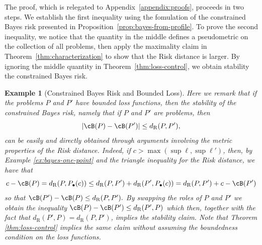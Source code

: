 \documentclass[twoside,11pt]{article}
\newtheorem{examples}[theorem]{Example}
\newcommand{\dexp}[1][]{d_{\mathrm{R}#1}}
\begin{document}
The proof, which is relegated to Appendix~\ref{appendix:proofs}, proceeds in two steps. We establish the first inequality using the fomulation of the constrained Bayes risk presented in Proposition~\ref{prop:bayes-from-profile}. To prove the second inequality, we notice that the quantity in the middle defines a pseudometric on the collection of all problems, then apply the maximality claim in Theorem~\ref{thm:characterization} to show that the Risk distance is larger.
By ignoring the middle quantity in Theorem~\ref{thm:loss-control}, we obtain stability the constrained Bayes risk. 
\begin{examples}[Constrained Bayes Risk and Bounded Loss]
Here we remark that if the problems $P$ and $P'$ have bounded loss functions, then the stability of the constrained Bayes risk, namely that 
if $P$ and $P'$ are problems, then
    \[|\cB(P) - \cB(P')| \leq \dexp(P,P'),\]
can be easily and directly obtained through arguments involving the metric properties of the Risk distance. Indeed, if $c>\max(\sup \ell,\sup \ell')$, then,   by Example \ref{ex:bayes-one-point} and the triangle inequality for the Risk distance, we have that
$$c-\cB(P) = \dexp(P,P_\bullet(c)) \leq \dexp(P,P') + \dexp(P',P_\bullet(c)) = \dexp(P,P') + c-\cB(P')$$
so that $\cB(P')-\cB(P)\leq \dexp(P,P').$ By swapping the roles of $P$ and $P'$ we obtain the inequality $\cB(P)-\cB(P')\leq \dexp(P',P)$ which then, together with the fact that $\dexp(P',P) = \dexp(P,P')$,  implies the stability claim. Note that Theorem \ref{thm:loss-control} implies the same claim without assuming the boundedness condition on the loss functions.
\end{examples}
\end{document}
